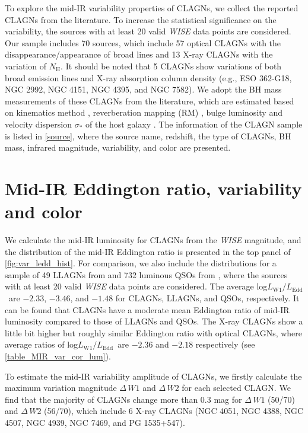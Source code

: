 \documentclass[linenumbers]{aastex631}
\begin{document}
To explore the mid-IR variability properties of CLAGNs, we collect the reported CLAGNs from the literature. To increase the statistical significance on the variability, the sources with at least 20 valid \textit{WISE} data points are considered. Our sample includes 70 sources, which include 57 optical CLAGNs with the disappearance/appearance of broad lines and 13 X-ray CLAGNs with the variation of $N_\mathrm{H}$. It should be noted that 5 CLAGNs show variations of both broad emission lines and X-ray absorption column density (e.g., ESO 362-G18, NGC 2992, NGC 4151, NGC 4395, and NGC 7582). We adopt the BH mass measurements of these CLAGNs from the literature, which are estimated based on kinematics method \citep[e.g.,][]{2003MNRAS.345.1057M}, reverberation mapping (RM) \citep[e.g.,][]{2011MNRAS.410.1877S,2017ApJ...840...97F}, bulge luminosity \citep[$L_\mathrm{bulge}$, e.g.,][]{2006AJ....131.1236D} and velocity dispersion $\sigma_{*}$ of the host galaxy \citep{2002ApJ...574..740T}. The information of the CLAGN sample is listed in \autoref{source}, where the source name, redshift, the type of CLAGNs, BH mass, infrared magnitude, variability, and color are presented.




\section{Mid-IR Eddington ratio, variability and color}\label{sec:mir_var_col_lum}
We calculate the mid-IR luminosity for CLAGNs from the \textit{WISE} magnitude, and the distribution of the mid-IR Eddington ratio is presented in the top panel of \autoref{fig:var_ledd_hist}. For comparison, we also include the distributions for a sample of 49 LLAGNs from \citet{2009MNRAS.399..349G} and 732 luminous QSOs from \citet{2007ApJ...667..131G}, where the sources with at least 20 valid \textit{WISE} data points are considered. The average log$L_\mathrm{W1}/L_\mathrm{Edd}$\, are $-2.33$, $-3.46$, and $-1.48$ for CLAGNs, LLAGNs, and QSOs, respectively. It can be found that CLAGNs have a moderate mean Eddington ratio of mid-IR luminosity compared to those of LLAGNs and QSOs. The X-ray CLAGNs show a little bit higher but roughly similar Eddington ratio with optical CLAGNs, where average ratios of log$L_\mathrm{W1}/L_\mathrm{Edd}$\ are $-2.36$ and $-2.18$ respectively (see \autoref{table_MIR_var_cor_lum}).     
 

To estimate the mid-IR variability amplitude of CLAGNs, we firstly calculate the maximum variation magnitude $\Delta\,W1$ and $\Delta\,W2$ for each selected CLAGN. We find that the majority of CLAGNs change more than $0.3$ mag for $\Delta\,W1$ (50/70) and $\Delta\,W2$ (56/70), which include 6 X-ray CLAGNs (NGC 4051, NGC 4388, NGC 4507, NGC 4939, NGC 7469, and PG 1535+547). 
\end{document}
